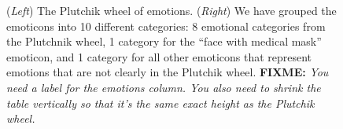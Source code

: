 \documentclass[11pt]{article}
\newcommand{\fixme}[1]{{\color{red} \textbf{FIXME:} {\textit {#1}}}}
\begin{document}
\begin{figure}
    \centering
    \label{fig:plu_wheel}
    \caption{
        (\emph{Left}) 
        The Plutchik wheel of emotions.
        (\emph{Right}) 
        We have grouped the emoticons into 10 different categories:
        8 emotional categories from the Plutchnik wheel,
        1 category for the ``face with medical mask'' emoticon,
        and 1 category for all other emoticons that represent emotions that are not clearly in the Plutchik wheel.
        \fixme{
            You need a label for the emotions column.  You also need to shrink the table vertically so that it's the same exact height as the Plutchik wheel.
        }
    }
    \label{fig:Mapped_emojis}%
\end{figure}
\end{document}
